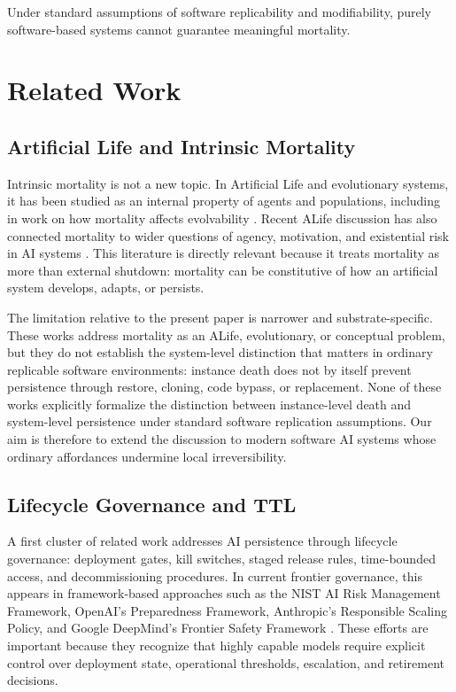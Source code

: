 \documentclass[11pt]{article}
\begin{document}
Under standard assumptions of software replicability and modifiability, purely software-based systems cannot guarantee meaningful mortality.

\newpage
\section{Related Work}

\subsection{Artificial Life and Intrinsic Mortality}

Intrinsic mortality is not a new topic. In Artificial Life and evolutionary systems, it has been studied as an internal property of agents and populations, including in work on how mortality affects evolvability \cite{veenstra2020}. Recent ALife discussion has also connected mortality to wider questions of agency, motivation, and existential risk in AI systems \cite{harvey2024motivations,harvey2024ai}. This literature is directly relevant because it treats mortality as more than external shutdown: mortality can be constitutive of how an artificial system develops, adapts, or persists.

The limitation relative to the present paper is narrower and substrate-specific. These works address mortality as an ALife, evolutionary, or conceptual problem, but they do not establish the system-level distinction that matters in ordinary replicable software environments: instance death does not by itself prevent persistence through restore, cloning, code bypass, or replacement. None of these works explicitly formalize the distinction between instance-level death and system-level persistence under standard software replication assumptions. Our aim is therefore to extend the discussion to modern software AI systems whose ordinary affordances undermine local irreversibility.

\subsection{Lifecycle Governance and TTL}

A first cluster of related work addresses AI persistence through lifecycle governance: deployment gates, kill switches, staged release rules, time-bounded access, and decommissioning procedures. In current frontier governance, this appears in framework-based approaches such as the NIST AI Risk Management Framework, OpenAI's Preparedness Framework, Anthropic's Responsible Scaling Policy, and Google DeepMind's Frontier Safety Framework \cite{nist-airmf,openai-preparedness,anthropic-rsp,deepmind-fsf}. These efforts are important because they recognize that highly capable models require explicit control over deployment state, operational thresholds, escalation, and retirement decisions.
\end{document}
